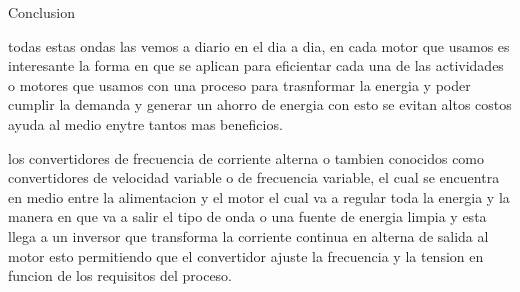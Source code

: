 \documentclass[10pt,a4paper]{article}
\begin{document}
Conclusion 

todas estas ondas las vemos a diario en el dia a dia, en cada motor que usamos es interesante la forma en que se aplican para eficientar cada una de las actividades o motores que usamos con una proceso para trasnformar la energia y poder cumplir la demanda y generar un ahorro de energia con esto se evitan altos costos ayuda al medio enytre tantos mas beneficios.

los convertidores de frecuencia de corriente alterna o tambien conocidos como convertidores de velocidad variable o de frecuencia variable, el cual se encuentra en medio entre la alimentacion y el motor el cual va a regular toda la energia y la manera en que va a salir el tipo de onda o una fuente de energia limpia y esta llega a un inversor que transforma la corriente continua en alterna de salida al motor esto permitiendo que el convertidor ajuste la frecuencia y la tension en funcion de los requisitos del proceso.
\end{document}

